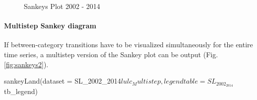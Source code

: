 \begin{Schunk}
\begin{figure}[htbp]

{\centering {}

}

\caption[Sankeys Plot 2002 - 2014]{Sankeys Plot 2002 - 2014}\label{fig:sankeys}
\end{figure}
\end{Schunk}

\hypertarget{multistep-sankey-diagram}{%
\paragraph{Multistep Sankey diagram}\label{multistep-sankey-diagram}}

If between-category transitions have to be visualized simultaneously for
the entire time series, a multistep version of the Sankey plot can be
output (Fig. \ref{fig:sankeys2}).

\begin{Schunk}
\begin{Sinput}
sankeyLand(dataset = SL_2002_2014$lulc_Multistep,
           legendtable = SL_2002_2014$tb_legend)
\end{Sinput}
\end{Schunk}

